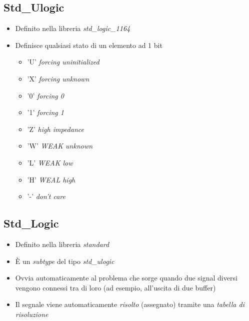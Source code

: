 \documentclass{article}
\begin{document}
\subsection{Std\_Ulogic}
\begin{itemize}
	\item Definito nella libreria \textit{std\_logic\_1164}
	\item Definisce qualsiasi stato di un elemento ad 1 bit
	      \begin{itemize}
	      	\item 'U' \textit{forcing uninitialized}
	      	\item 'X' \textit{forcing unknown}
	      	\item '0' \textit{forcing 0}
	      	\item '1' \textit{forcing 1}
	      	\item 'Z' \textit{high impedance}
	      	\item 'W' \textit{WEAK unknown}
	      	\item 'L' \textit{WEAK low}
	      	\item 'H' \textit{WEAL high}
	      	\item '-' \textit{don't care}
	      \end{itemize}
\end{itemize}	
     
\subsection{Std\_Logic}
\begin{itemize}
	\item Definito nella libreria \textit{standard}
	\item \`E un \textit{subtype} del tipo \textit{std\_ulogic}
	\item Ovvia automaticamente al problema che sorge quando due signal diversi vengono connessi tra di loro (ad esempio, all'uscita di due buffer)
	\item Il segnale viene automaticamente \textit{risolto} (assegnato) tramite una \textit{tabella di risoluzione}
\end{itemize}
\end{document}
